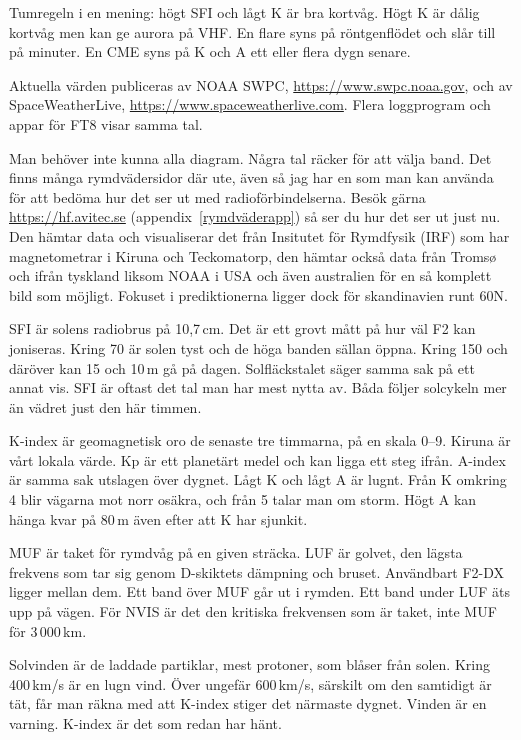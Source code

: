 Tumregeln i en mening: högt SFI och lågt K är bra kortvåg. Högt K är dålig
kortvåg men kan ge aurora på VHF. En flare syns på röntgenflödet och slår
till på minuter. En CME syns på K och A ett eller flera dygn senare.

Aktuella värden publiceras av NOAA SWPC,
\url{https://www.swpc.noaa.gov}, och av SpaceWeatherLive,
\url{https://www.spaceweatherlive.com}. Flera loggprogram och appar för
FT8 visar samma tal.

Man behöver inte kunna alla diagram. Några tal räcker för att välja
band. Det finns många rymdvädersidor där ute, även så jag har en som
man kan använda för att bedöma hur det ser ut med
radioförbindelserna. Besök gärna \url{https://hf.avitec.se}
(appendix~\ref{rymdväderapp}) så ser du hur det ser ut just nu. Den
hämtar data och visualiserar det från
Insitutet för Rymdfysik (IRF) som har magnetometrar i Kiruna och
Teckomatorp, den hämtar också data från Tromsø och ifrån tyskland
liksom NOAA i USA och även australien för en så komplett bild som
möjligt. Fokuset i prediktionerna ligger dock för skandinavien runt
60\textdegree N.

SFI är solens radiobrus på 10,7\,cm. Det är ett grovt mått på hur väl
F2 kan joniseras. Kring 70 är solen tyst och de höga banden sällan
öppna. Kring 150 och däröver kan 15 och 10\,m gå på
dagen. Solfläckstalet säger samma sak på ett annat vis. SFI är oftast
det tal man har mest nytta av.  Båda följer solcykeln mer än vädret
just den här timmen.

K-index är geomagnetisk oro de senaste tre timmarna, på en skala 0--9.
Kiruna är vårt lokala värde. Kp är ett planetärt medel och kan ligga
ett steg ifrån. A-index är samma sak utslagen över dygnet. Lågt K och
lågt A är lugnt. Från K omkring 4 blir vägarna mot norr osäkra, och
från 5 talar man om storm. Högt A kan hänga kvar på 80\,m även efter
att K har sjunkit.

MUF är taket för rymdvåg på en given sträcka. LUF är golvet, den
lägsta frekvens som tar sig genom D-skiktets dämpning och
bruset. Användbart F2-DX ligger mellan dem. Ett band över MUF går ut i
rymden. Ett band under LUF äts upp på vägen. För NVIS är det den
kritiska frekvensen som är taket, inte MUF för 3\,000\,km.

Solvinden är de laddade partiklar, mest protoner, som blåser från
solen.  Kring 400\,km/s är en lugn vind. Över ungefär 600\,km/s,
särskilt om den samtidigt är tät, får man räkna med att K-index stiger
det närmaste dygnet. Vinden är en varning. K-index är det som redan
har hänt.

